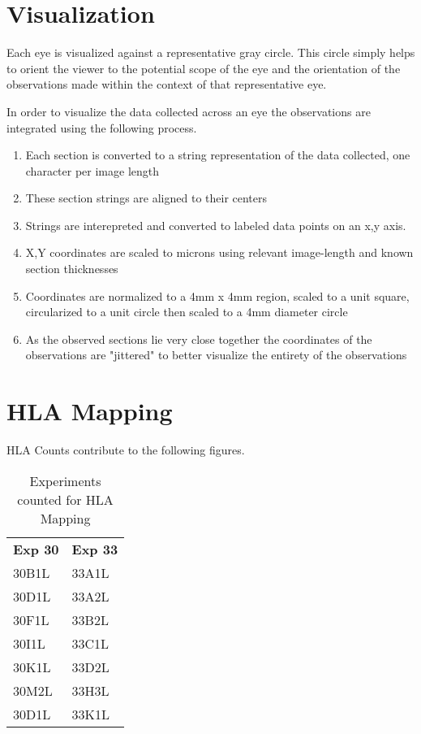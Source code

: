 \documentclass{article}
\begin{document}
\section{Visualization}
Each eye is visualized against a representative gray circle. This circle simply helps to orient the viewer to the potential scope of the eye and the orientation of the observations made within the context of that representative eye.

In order to visualize the data collected across an eye the observations are integrated using the following process. 

\begin{enumerate}
\item Each section is converted to a string representation of the data collected, one character per image length
\item These section strings are aligned to their centers
\item Strings are interepreted and converted to labeled data points on an x,y axis. 
\item X,Y coordinates are scaled to microns using relevant image-length and known section thicknesses
\item Coordinates are normalized to a 4mm x 4mm region, scaled to a unit square, circularized to a unit circle then scaled to a 4mm diameter circle
\item As the observed sections lie very close together the coordinates of the observations are "jittered" to better visualize the entirety of the observations
\end{enumerate}


\section{HLA Mapping}
HLA Counts contribute to the following figures. 
\begin{table}[]
\centering
\begin{tabular}{ll}
 \textbf{Exp 30} & \textbf{Exp 33} \\
30B1L & 33A1L \\
30D1L & 33A2L \\
30F1L & 33B2L \\
30I1L & 33C1L \\
30K1L & 33D2L \\
30M2L & 33H3L \\
30D1L & 33K1L \\
\end{tabular}
\caption{Experiments counted for HLA Mapping}
\end{table}
\end{document}
